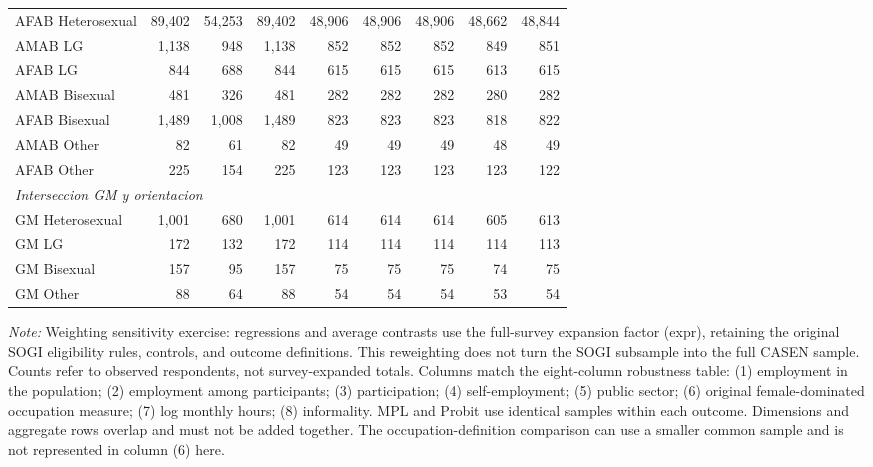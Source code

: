 \begin{table}[htbp]
{\begin{tabular}{lrrrrrrrr}
AFAB Heterosexual & 89,402 & 54,253 & 89,402 & 48,906 & 48,906 & 48,906 & 48,662 & 48,844 \\
AMAB LG & 1,138 & 948 & 1,138 & 852 & 852 & 852 & 849 & 851 \\
AFAB LG & 844 & 688 & 844 & 615 & 615 & 615 & 613 & 615 \\
AMAB Bisexual & 481 & 326 & 481 & 282 & 282 & 282 & 280 & 282 \\
AFAB Bisexual & 1,489 & 1,008 & 1,489 & 823 & 823 & 823 & 818 & 822 \\
AMAB Other & 82 & 61 & 82 & 49 & 49 & 49 & 48 & 49 \\
AFAB Other & 225 & 154 & 225 & 123 & 123 & 123 & 123 & 122 \\
\midrule
\multicolumn{9}{l}{\textit{Interseccion GM y orientacion}} \\
GM Heterosexual & 1,001 & 680 & 1,001 & 614 & 614 & 614 & 605 & 613 \\
GM LG & 172 & 132 & 172 & 114 & 114 & 114 & 114 & 113 \\
GM Bisexual & 157 & 95 & 157 & 75 & 75 & 75 & 74 & 75 \\
GM Other & 88 & 64 & 88 & 54 & 54 & 54 & 53 & 54 \\
\midrule
\bottomrule
\end{tabular}%
}
\par\smallskip\footnotesize\textit{Note:} Weighting sensitivity exercise: regressions and average contrasts use the full-survey expansion factor (expr), retaining the original SOGI eligibility rules, controls, and outcome definitions. This reweighting does not turn the SOGI subsample into the full CASEN sample. Counts refer to observed respondents, not survey-expanded totals. Columns match the eight-column robustness table: (1) employment in the population; (2) employment among participants; (3) participation; (4) self-employment; (5) public sector; (6) original female-dominated occupation measure; (7) log monthly hours; (8) informality. MPL and Probit use identical samples within each outcome. Dimensions and aggregate rows overlap and must not be added together. The occupation-definition comparison can use a smaller common sample and is not represented in column (6) here.
\end{table}

